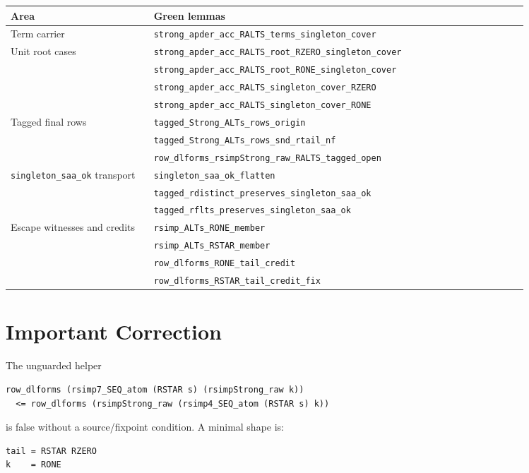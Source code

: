 \documentclass[11pt]{article}
\newcommand{\code}[1]{\texttt{\small #1}}
\begin{document}
\begin{longtable}{p{0.26\linewidth}p{0.68\linewidth}}
\textbf{Area} & \textbf{Green lemmas}\\
\hline
\endhead
Term carrier &
\code{strong\_apder\_acc\_RALTS\_terms\_singleton\_cover}\\
Unit root cases &
\code{strong\_apder\_acc\_RALTS\_root\_RZERO\_singleton\_cover}\\
&
\code{strong\_apder\_acc\_RALTS\_root\_RONE\_singleton\_cover}\\
&
\code{strong\_apder\_acc\_RALTS\_singleton\_cover\_RZERO}\\
&
\code{strong\_apder\_acc\_RALTS\_singleton\_cover\_RONE}\\
Tagged final rows &
\code{tagged\_Strong\_ALTs\_rows\_origin}\\
&
\code{tagged\_Strong\_ALTs\_rows\_snd\_rtail\_nf}\\
&
\code{row\_dlforms\_rsimpStrong\_raw\_RALTS\_tagged\_open}\\
\code{singleton\_saa\_ok} transport &
\code{singleton\_saa\_ok\_flatten}\\
&
\code{tagged\_rdistinct\_preserves\_singleton\_saa\_ok}\\
&
\code{tagged\_rflts\_preserves\_singleton\_saa\_ok}\\
Escape witnesses and credits &
\code{rsimp\_ALTs\_RONE\_member}\\
&
\code{rsimp\_ALTs\_RSTAR\_member}\\
&
\code{row\_dlforms\_RONE\_tail\_credit}\\
&
\code{row\_dlforms\_RSTAR\_tail\_credit\_fix}\\
\end{longtable}

\section*{Important Correction}

The unguarded helper

\begin{verbatim}
row_dlforms (rsimp7_SEQ_atom (RSTAR s) (rsimpStrong_raw k))
  <= row_dlforms (rsimpStrong_raw (rsimp4_SEQ_atom (RSTAR s) k))
\end{verbatim}

is false without a source/fixpoint condition. A minimal shape is:

\begin{verbatim}
tail = RSTAR RZERO
k    = RONE
\end{verbatim}
\end{document}
